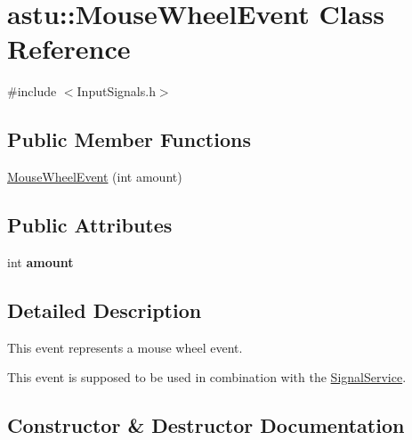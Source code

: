 \hypertarget{classastu_1_1MouseWheelEvent}{}\section{astu\+:\+:Mouse\+Wheel\+Event Class Reference}
\label{classastu_1_1MouseWheelEvent}


{\ttfamily \#include $<$Input\+Signals.\+h$>$}

\subsection*{Public Member Functions}
\begin{DoxyCompactItemize}
\item 
\hyperlink{classastu_1_1MouseWheelEvent_ade64a915c985850b21edbec59720b92c}{Mouse\+Wheel\+Event} (int amount)
\end{DoxyCompactItemize}
\subsection*{Public Attributes}
\begin{DoxyCompactItemize}
\item 
\mbox{\label{classastu_1_1MouseWheelEvent_a61b9fbc65215775b8aed701f9c0807b1}} 
int {\bfseries amount}
\end{DoxyCompactItemize}


\subsection{Detailed Description}
This event represents a mouse wheel event.

This event is supposed to be used in combination with the \hyperlink{classastu_1_1SignalService}{Signal\+Service}. 

\subsection{Constructor \& Destructor Documentation}
\mbox{\label{classastu_1_1MouseWheelEvent_ade64a915c985850b21edbec59720b92c}} 
